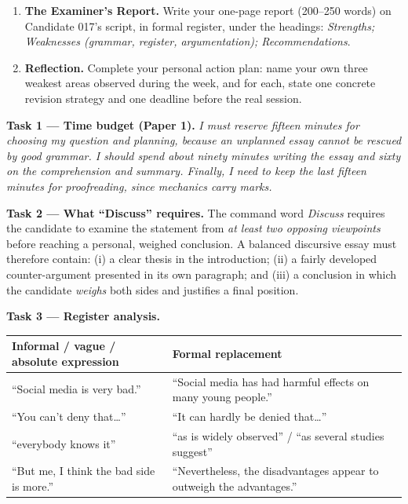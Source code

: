 \documentclass[11pt]{article}
\newcommand{\cle}[1]{{\popxbold\color{popdark}#1}}
\newcounter{popsec}
\newcounter{popsub}
\newcommand{\courssub}[1]{%
  \stepcounter{popsub}%
  \par\vspace{9pt}\noindent{\popxbold\fontsize{11.5}{13}\selectfont\color{popink}{\color{poporange}\thepopsec.\thepopsub}\hspace{6pt}#1}\par\nopagebreak\vspace{4pt}
}
\begin{document}
\begin{enumerate}
\item \textbf{The Examiner's Report.} Write your one-page report (200--250 words) on Candidate 017's script, in formal register, under the headings: \emph{Strengths; Weaknesses (grammar, register, argumentation); Recommendations}.

\item \textbf{Reflection.} Complete your personal action plan: name your own three weakest areas observed during the week, and for each, state one concrete revision strategy and one deadline before the real session.
\end{enumerate}

\courssub{Model answer}

\textbf{Task 1 — Time budget (Paper 1).} \emph{I must reserve fifteen minutes for choosing my question and planning, because an unplanned essay cannot be rescued by good grammar. I should spend about ninety minutes writing the essay and sixty on the comprehension and summary. Finally, I need to keep the last fifteen minutes for proofreading, since mechanics carry marks.}

\textbf{Task 2 — What ``Discuss'' requires.} The command word \emph{Discuss} requires the candidate to examine the statement from \emph{at least two opposing viewpoints} before reaching a personal, weighed conclusion. A balanced discursive essay must therefore contain: (i) a clear \cle{thesis} in the introduction; (ii) a fairly developed \cle{counter-argument} presented in its own paragraph; and (iii) a conclusion in which the candidate \emph{weighs} both sides and justifies a final position.

\textbf{Task 3 — Register analysis.}

\begin{center}
\begin{tabularx}{\linewidth}{|X|X|}
\hline
\rowcolor{popblueL} \textbf{Informal / vague / absolute expression} & \textbf{Formal replacement} \\
\hline
``Social media is very bad.'' & ``Social media has had harmful effects on many young people.'' \\
\hline
``You can't deny that\ldots'' & ``It can hardly be denied that\ldots'' \\
\hline
``everybody knows it'' & ``as is widely observed'' / ``as several studies suggest'' \\
\hline
``But me, I think the bad side is more.'' & ``Nevertheless, the disadvantages appear to outweigh the advantages.'' \\
\hline
\end{tabularx}
\end{center}
\end{document}
